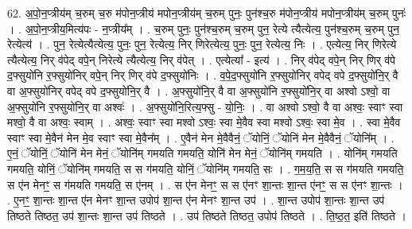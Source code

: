 \documentclass[17pt]{extarticle}
\begin{document}
62. अ॒पो॒न॒प्त्रीय॑म् च॒रुम् च॒रु म॑पोन॒प्त्रीय॑ मपोन॒प्त्रीय॑म् च॒रुम् पुनः॒ पुन॑श्च॒रु म॑पोन॒प्त्रीय॑ मपोन॒प्त्रीय॑म् च॒रुम् पुनः॑ । . अ॒पो॒न॒प्त्रीय॒मित्य॑पः - न॒प्त्रीय᳚म् । . च॒रुम् पुनः॒ पुन॑श्च॒रुम् च॒रुम् पुन॒ रेत्ये त्यैत्येत्य॒ पुन॑श्च॒रुम् च॒रुम् पुन॒ रेत्येत्य॑ । . पुन॒ रेत्येत्यैत्येत्य॒ पुनः॒ पुन॒ रेत्येत्य॒ निर् णिरेत्येत्य॒ पुनः॒ पुन॒ रेत्येत्य॒ निः । . एत्येत्य॒ निर् णिरेत्ये त्यैत्येत्य॒ निर् व॑पेद् वपे॒न् निरेत्ये त्यैत्येत्य॒ निर् व॑पेत् । . एत्येत्या᳚ - इत्य॑ । . निर् व॑पेद् वपे॒न् निर् णिर् व॑पे द॒फ्सुयो॑नि र॒फ्सुयो॑निर् वपे॒न् निर् णिर् व॑पे द॒फ्सुयो॑निः । . व॒पे॒द॒फ्सुयो॑नि र॒फ्सुयो॑निर् वपेद् वपे द॒फ्सुयो॑नि॒र् वै वा अ॒फ्सुयो॑निर् वपेद् वपे द॒फ्सुयो॑नि॒र् वै । . अ॒फ्सुयो॑नि॒र् वै वा अ॒फ्सुयो॑नि र॒फ्सुयो॑नि॒र् वा अश्वो ऽश्वो॒ वा अ॒फ्सुयो॑नि र॒फ्सुयो॑नि॒र् वा अश्वः॑ । . अ॒फ्सुयो॑नि॒रित्य॒फ्सु - यो॒निः॒ । . वा अश्वो ऽश्वो॒ वै वा अश्वः॒ स्वाꣳ स्वा मश्वो॒ वै वा अश्वः॒ स्वाम् । . अश्वः॒ स्वाꣳ स्वा मश्वो ऽश्वः॒ स्वा मे॒वैव स्वा मश्वो ऽश्वः॒ स्वा मे॒व । . स्वा मे॒वैव स्वाꣳ स्वा मे॒वैन॑ मेन मे॒व स्वाꣳ स्वा मे॒वैन᳚म् । . ए॒वैन॑ मेन मे॒वैवैनं॒ ॅयोनिं॒ ॅयोनि॑ मेन मे॒वैवैनं॒ ॅयोनि᳚म् । . ए॒नं॒ ॅयोनिं॒ ॅयोनि॑ मेन मेनं॒ ॅयोनि॑म् गमयति गमयति॒ योनि॑ मेन मेनं॒ ॅयोनि॑म् गमयति । . योनि॑म् गमयति गमयति॒ योनिं॒ ॅयोनि॑म् गमयति॒ स स ग॑मयति॒ योनिं॒ ॅयोनि॑म् गमयति॒ सः । . ग॒म॒य॒ति॒ स स ग॑मयति गमयति॒ स ए॑न मेनꣳ॒॒ स ग॑मयति गमयति॒ स ए॑नम् । . स ए॑न मेनꣳ॒॒ स स ए॑नꣳ शा॒न्तः शा॒न्त ए॑नꣳ॒॒ स स ए॑नꣳ शा॒न्तः । . ए॒नꣳ॒॒ शा॒न्तः शा॒न्त ए॑न मेनꣳ शा॒न्त उपोप॑ शा॒न्त ए॑न मेनꣳ शा॒न्त उप॑ । . शा॒न्त उपोप॑ शा॒न्तः शा॒न्त उप॑ तिष्ठते तिष्ठत॒ उप॑ शा॒न्तः शा॒न्त उप॑ तिष्ठते । . उप॑ तिष्ठते तिष्ठत॒ उपोप॑ तिष्ठते । . ति॒ष्ठ॒त॒ इति॑ तिष्ठते । \newline
\pagebreak
{}
\end{document}
